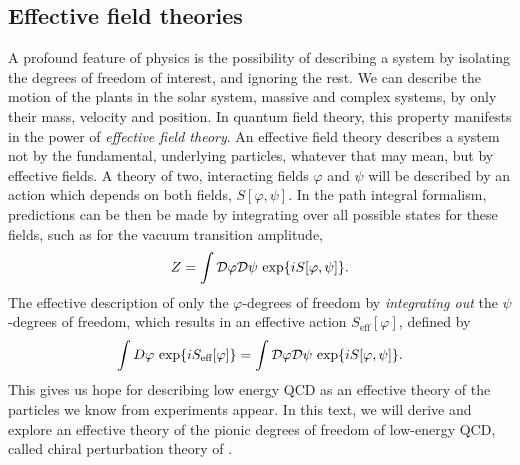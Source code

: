 \subsection*{Effective field theories}

A profound feature of physics is the possibility of describing a system by isolating the degrees of freedom of interest, and ignoring the rest.
We can describe the motion of the plants in the solar system, massive and complex systems, by only their mass, velocity and position.
In quantum field theory, this property manifests in the power of \emph{effective field theory}.
An effective field theory describes a system not by the fundamental, underlying particles, whatever that may mean, but by effective fields.
A theory of two, interacting fields $\varphi$ and $\psi$ will be described by an action which depends on both fields, $S[\varphi, \psi]$.
In the path integral formalism, predictions can be then be made by integrating over all possible states for these fields, such as for the vacuum transition amplitude,
\begin{equation}
    Z = \int \mathcal{D} \varphi \mathcal{D} \psi \, \exp{i S[\varphi, \psi]}.
\end{equation}
The effective description of only the $\varphi$-degrees of freedom by \emph{integrating out} the $\psi$-degrees of freedom, which results in an effective action $S_\text{eff}[\varphi]$, defined by~\cite{Schwartz:QFT}
\begin{equation}
    \label{integrating out degrees of freedom}
    \int D \varphi \, \exp{i S_\text{eff}[\varphi]} 
    =
    \int \mathcal{D} \varphi \mathcal{D} \psi \, \exp{i S[\varphi, \psi]}.
\end{equation}
This gives us hope for describing low energy QCD as an effective theory of the particles we know from experiments appear.
In this text, we will derive and explore an effective theory of the pionic degrees of freedom of low-energy QCD, called chiral perturbation theory of \chpt.

